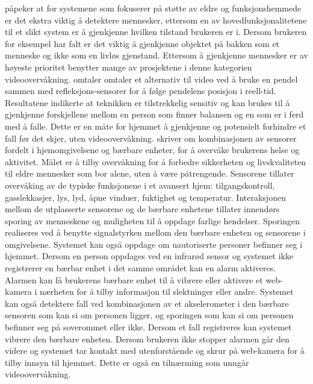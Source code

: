 \citet{desilva12} påpeker at for systemene som fokuserer på støtte av eldre og funksjonshemmede er det ekstra viktig å detektere mennesker, ettersom en av hovedfunksjonalitetene til et slikt system er å gjenkjenne hvilken tilstand brukeren er i. Dersom brukeren for eksempel har falt er det viktig å gjenkjenne objektet på bakken som et menneske og ikke som en livløs gjenstand. Ettersom å gjenkjenne mennesker er av høyeste prioritet benytter mange av prosjektene i denne kategorien videoovervåkning. \citet{elliot09} omtaler omtaler et alternativ til video ved å bruke en pendel sammen med refleksjons-sensorer for å følge pendelens posisjon i reell-tid. Resultatene indikerte at teknikken er tilstrekkelig sensitiv og kan brukes til å gjenkjenne forskjellene mellom en person som finner balansen og en som er i ferd med å falle. Dette er en måte for hjemmet å gjenkjenne og potensielt forhindre et fall før det skjer, uten videoovervåkning. \citet{casattenta} skriver om kombinasjonen av sensorer fordelt i hjemomgivelsene og bærbare enheter, for å overvåke brukerens helse og aktivitet. Målet er å tilby overvåkning for å forbedre sikkerheten og livskvaliteten til eldre mennesker som bor alene, uten å være påtrengende. Sensorene tillater overvåking av de typiske funksjonene i et avansert hjem: tilgangskontroll, gasslekkasjer, lys, lyd, åpne vinduer, fuktighet og temperatur. Interaksjonen mellom de utplasserte sensorene og de bærbare enhetene tillater innendørs sporing av menneskene og muligheten til å oppdage farlige hendelser. Sporingen realiseres ved å benytte signalstyrken mellom den bærbare enheten og sensorene i omgivelsene. Systemet kan også oppdage om uautoriserte personer befinner seg i hjemmet. Dersom en person oppdages ved en infrarød sensor og systemet ikke registrerer en bærbar enhet i det samme området kan en alarm aktiveres. Alarmen kan få brukerens bærbare enhet til å vibrere eller aktivere et web-kamera i nærheten for å tilby informasjon til slektninger eller andre. Systemet kan også detektere fall ved kombinasjonen av et akselerometer i den bærbare sensoren som kan si om personen ligger, og sporingen som kan si om personen befinner seg på soverommet eller ikke. Dersom et fall registreres kan systemet vibrere den bærbare enheten. Dersom brukeren ikke stopper alarmen går den videre og systemet tar kontakt med utenforstående og skrur på web-kamera for å tilby innsyn til hjemmet. Dette er også en tilnærming som unngår videoovervåkning.

